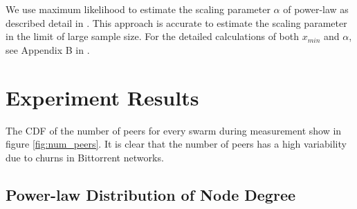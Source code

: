 \documentclass[10pt,conference,letterpaper,final]{IEEEtran}
\begin{document}

We use maximum likelihood to estimate the scaling parameter $\alpha$ of power-law as described detail in \cite{clauset2009power}.  
This approach is accurate to estimate the scaling parameter in the limit of large sample size. 
For the detailed calculations of both $x_{min}$ and $\alpha$, see Appendix B in \cite{clauset2009power}.

\section{Experiment Results}\label{result}
The CDF of the number of peers for every swarm during measurement show in figure \ref{fig:num_peers}. 
It is clear that the number of peers has a high variability due to churns in Bittorrent networks. 

\subsection{Power-law Distribution of Node Degree}
\end{document}
